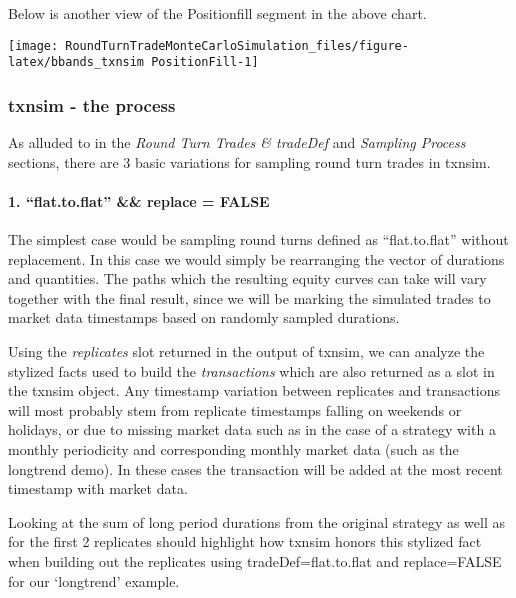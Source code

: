 Below is another view of the Positionfill segment in the above chart.

\begin{Schunk}


\begin{center}\texttt{[image: RoundTurnTradeMonteCarloSimulation\_files/figure-latex/bbands\_txnsim PositionFill-1]} \end{center}

\end{Schunk}

\hypertarget{txnsim---the-process}{%
\subsubsection{txnsim - the process}\label{txnsim---the-process}}

As alluded to in the \emph{Round Turn Trades \& tradeDef} and
\emph{Sampling Process} sections, there are 3 basic variations for
sampling round turn trades in txnsim.

\hypertarget{flat.to.flat-replace-false}{%
\paragraph{1. ``flat.to.flat'' \&\& replace =
FALSE}\label{flat.to.flat-replace-false}}

The simplest case would be sampling round turns defined as
``flat.to.flat'' without replacement. In this case we would simply be
rearranging the vector of durations and quantities. The paths which the
resulting equity curves can take will vary together with the final
result, since we will be marking the simulated trades to market data
timestamps based on randomly sampled durations.

Using the \emph{replicates} slot returned in the output of txnsim, we
can analyze the stylized facts used to build the \emph{transactions}
which are also returned as a slot in the txnsim object. Any timestamp
variation between replicates and transactions will most probably stem
from replicate timestamps falling on weekends or holidays, or due to
missing market data such as in the case of a strategy with a monthly
periodicity and corresponding monthly market data (such as the longtrend
demo). In these cases the transaction will be added at the most recent
timestamp with market data.

Looking at the sum of long period durations from the original strategy
as well as for the first 2 replicates should highlight how txnsim honors
this stylized fact when building out the replicates using
tradeDef=flat.to.flat and replace=FALSE for our `longtrend' example.

